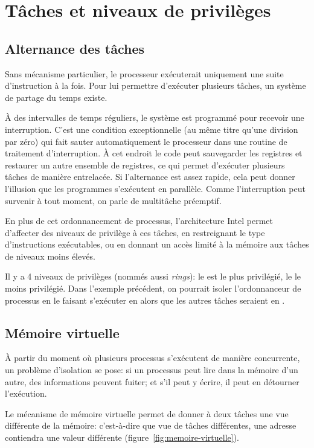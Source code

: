 \section{Tâches et niveaux de privilèges}
\label{sec:taches}

\subsection*{Alternance des tâches}

Sans mécanisme particulier, le processeur exécuterait uniquement une suite
d'instruction à la fois. Pour lui permettre d'exécuter plusieurs tâches, un
système de partage du temps existe.

À des intervalles de temps réguliers, le système est programmé pour recevoir une
interruption. C'est une condition exceptionnelle (au même titre qu'une division
par zéro) qui fait sauter automatiquement le processeur dans une routine de
traitement d'interruption. À cet endroit le code peut sauvegarder les registres
et restaurer un autre ensemble de registres, ce qui permet d'exécuter plusieurs
tâches de manière entrelacée. Si l'alternance est assez rapide, cela peut donner
l'illusion que les programmes s'exécutent en parallèle. Comme l'interruption
peut survenir à tout moment, on parle de multitâche préemptif.

En plus de cet ordonnancement de processus, l'architecture Intel permet
d'affecter des niveaux de privilège à ces tâches, en restreignant le type
d'instructions exécutables, ou en donnant un accès limité à la mémoire aux
tâches de niveaux moins élevés.

Il y a 4 niveaux de privilèges (nommés aussi \emph{rings}): le  est le
plus privilégié, le  le moins privilégié. Dans l'exemple précédent, on
pourrait isoler l'ordonnanceur de processus en le faisant s'exécuter en 
alors que les autres tâches seraient en .

\subsection*{Mémoire virtuelle}

À partir du moment où plusieurs processus s'exécutent de manière concurrente, un
problème d'isolation se pose: si un processus peut lire dans la mémoire d'un
autre, des informations peuvent fuiter; et s'il peut y écrire, il peut en
détourner l'exécution.

Le mécanisme de mémoire virtuelle permet de donner à deux tâches une vue
différente de la mémoire: c'est-à-dire que vue de tâches différentes, une
adresse contiendra une valeur différente (figure~\ref{fig:memoire-virtuelle}).

